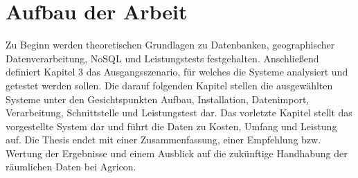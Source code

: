 \section{Aufbau der Arbeit}


Zu Beginn werden theoretischen Grundlagen zu Datenbanken, geographischer Datenverarbeitung, NoSQL und Leistungstests festgehalten.
Anschließend definiert Kapitel 3 das Ausgangsszenario, für welches die Systeme analysiert und getestet werden sollen.
Die darauf folgenden Kapitel stellen die ausgewählten Systeme unter den Gesichtspunkten Aufbau, Installation, Datenimport, Verarbeitung, Schnittstelle und Leistungstest dar.
Das vorletzte Kapitel stellt das vorgestellte System dar und führt die Daten zu Kosten, Umfang und Leistung auf.
Die Thesis endet mit einer Zusammenfassung, einer Empfehlung bzw. Wertung der Ergebnisse und einem Ausblick auf die zukünftige Handhabung der räumlichen Daten bei Agricon.